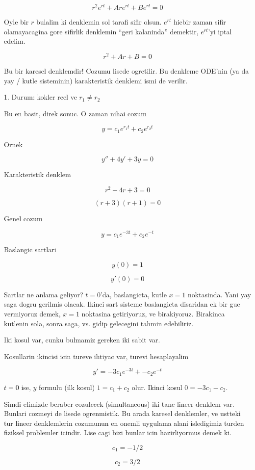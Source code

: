 \documentclass[12pt,fleqn]{article}
\begin{document}
\[ r^2e^{rt} + Are^{rt} + Be^{rt} = 0 \]

Oyle bir $r$ bulalim ki denklemin sol tarafi sifir olsun. $e^{rt}$ hicbir
zaman sifir olamayacagina gore sifirlik denklemin ``geri kalaninda''
demektir, $e^{rt}$'yi iptal edelim. 

\[ r^2 + Ar + B = 0 \]

Bu bir karesel denklemdir! Cozumu lisede ogretilir. Bu denkleme ODE'nin
(ya da yay / kutle sisteminin) karakteristik denklemi ismi de verilir.

1. Durum: kokler reel ve $r_1 \ne r_2$

Bu en basit, direk sonuc. O zaman nihai cozum

\[ y = c_1 e^{r_1t} + c_2  e^{r_2t}\]

Ornek

\[ y'' + 4y' + 3y = 0 \]

Karakteristik denklem

\[ r^2 + 4r + 3 = 0 \]

\[ (r+3)(r+1) = 0 \]

Genel cozum

\[ y = c_1e^{-3t} + c_2e^{-t} \]

Baslangic sartlari 

\[ y(0) = 1 \]

\[ y'(0) = 0 \]

Sartlar ne anlama geliyor? $t=0$'da, baslangicta, kutle $x=1$
noktasinda. Yani yay saga dogru gerilmis olacak. Ikinci sart sisteme
baslangicta disaridan ek bir guc vermiyoruz demek, $x=1$ noktasina
getiriyoruz, ve birakiyoruz. Birakinca kutlenin sola, sonra saga, vs. gidip
gelecegini tahmin edebiliriz. 

Iki kosul var, cunku bulmamiz gereken iki sabit var. 

Kosullarin ikincisi icin tureve ihtiyac var, turevi hesaplayalim

\[ y' = -3c_1e^{-3t} + - c_2 e^{-t} \]

$t = 0$ ise, $y$ formulu (ilk kosul) $1 = c_1 + c_2$ olur. Ikinci kosul
$0 =
-3c_1 - c_2$. 

Simdi elimizde beraber cozulecek (simultaneous) iki tane lineer denklem
var. Bunlari cozmeyi de lisede ogrenmistik. Bu arada karesel denklemler, ve
ustteki tur lineer denklemlerin cozumunun en onemli uygulama alani
isledigimiz turden fiziksel problemler icindir. Lise cagi bizi bunlar icin
hazirliyormus demek ki.

\[ c_1 = -1/2 \]

\[ c_2 = 3/2 \]
\end{document}
